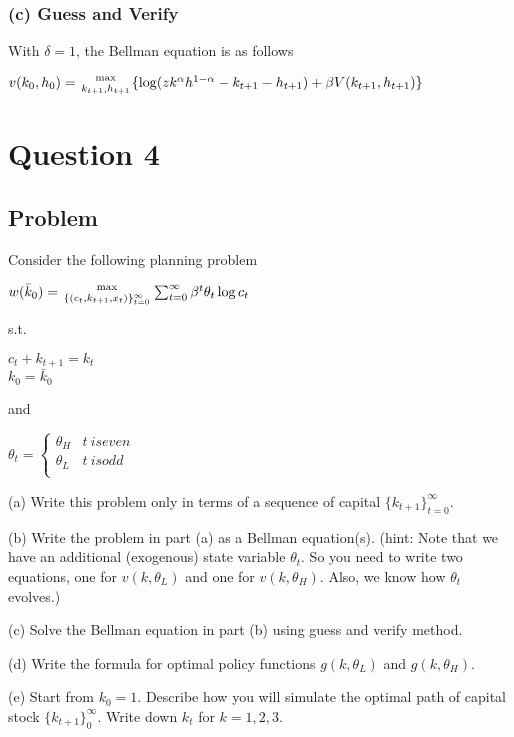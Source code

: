 \documentclass[10pt, a4paper]{article}
\begin{document}
    \subsubsection*{(c) Guess and Verify}
    With $\delta=1$, the Bellman equation is as follows
    \begin{center}
      $v(k_0,h_0) = {\max\atop{k_{t+1},h_{t+1}}}\{\log(zk^{\alpha}h^{1-\alpha}-k_{t+1}-h_{t+1})+\beta V(k_{t+1},h_{t+1})\}$
    \end{center}
\section*{Question 4}
  \subsection*{Problem}
    Consider the following planning problem
    \begin{center}
      $w(\bar k_0)={\max\atop{\{(c_t,k_{t+1},x_t)\}_{t=0}^{\infty}}}\sum^{\infty}_{t=0}\beta^t\theta_t\log c_t$
    \end{center}
    s.t.
    \begin{center}
      $c_t+k_{t+1} = k_t$ \\
      $k_0=\bar k_0$
    \end{center}
    and
    \begin{center}
      $\theta_t = \begin{cases} 
        \theta_H & t \ {is even} \\
        \theta_L & t \ {is odd} \\
      \end{cases}$
    \end{center}
    
    (a) Write this problem only in terms of a sequence of capital $\{k_{t+1}\}_{t=0}^{\infty}$.

    (b) Write the problem in part (a) as a Bellman equation(s). (hint: Note that we have an additional (exogenous) state variable $\theta_t$. So you need to write two equations, one for $v(k,\theta_L)$ and one for $v(k,\theta_H)$. Also, we know how $\theta_t$ evolves.)

    (c) Solve the Bellman equation in part (b) using guess and verify method.

    (d) Write the formula for optimal policy functions $g(k,\theta_L)$ and $g(k,\theta_H)$.

    (e) Start from $k_0=1$. Describe how you will simulate the optimal path of capital stock $\{k_{t+1}\}_0^{\infty}$. Write down $k_t$ for $k=1,2,3$. 
\end{document}
